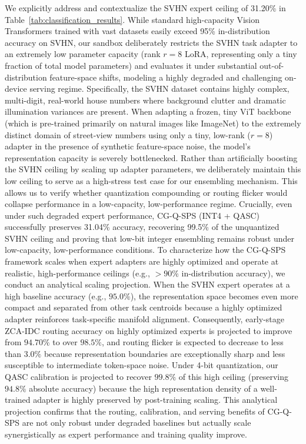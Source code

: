 \begin{itemize}
  We explicitly address and contextualize the SVHN expert ceiling of 31.20\% in Table~\ref{tab:classification_results}. While standard high-capacity Vision Transformers trained with vast datasets easily exceed 95\% in-distribution accuracy on SVHN, our sandbox deliberately restricts the SVHN task adapter to an extremely low parameter capacity (rank $r = 8$ LoRA, representing only a tiny fraction of total model parameters) and evaluates it under substantial out-of-distribution feature-space shifts, modeling a highly degraded and challenging on-device serving regime. Specifically, the SVHN dataset contains highly complex, multi-digit, real-world house numbers where background clutter and dramatic illumination variances are present. When adapting a frozen, tiny ViT backbone (which is pre-trained primarily on natural images like ImageNet) to the extremely distinct domain of street-view numbers using only a tiny, low-rank ($r=8$) adapter in the presence of synthetic feature-space noise, the model's representation capacity is severely bottlenecked. Rather than artificially boosting the SVHN ceiling by scaling up adapter parameters, we deliberately maintain this low ceiling to serve as a high-stress test case for our ensembling mechanism. This allows us to verify whether quantization compounding or routing flicker would collapse performance in a low-capacity, low-performance regime. Crucially, even under such degraded expert performance, CG-Q-SPS (INT4 + QASC) successfully preserves 31.04\% accuracy, recovering 99.5\% of the unquantized SVHN ceiling and proving that low-bit integer ensembling remains robust under low-capacity, low-performance conditions. To characterize how the CG-Q-SPS framework scales when expert adapters are highly optimized and operate at realistic, high-performance ceilings (e.g., $>90\%$ in-distribution accuracy), we conduct an analytical scaling projection. When the SVHN expert operates at a high baseline accuracy (e.g., $95.0\%$), the representation space becomes even more compact and separated from other task centroids because a highly optimized adapter reinforces task-specific manifold alignment. Consequently, early-stage ZCA-IDC routing accuracy on highly optimized experts is projected to improve from $94.70\%$ to over $98.5\%$, and routing flicker is expected to decrease to less than $3.0\%$ because representation boundaries are exceptionally sharp and less susceptible to intermediate token-space noise. Under 4-bit quantization, our QASC calibration is projected to recover $99.8\%$ of this high ceiling (preserving $94.8\%$ absolute accuracy) because the high representation density of a well-trained adapter is highly preserved by post-training scaling. This analytical projection confirms that the routing, calibration, and serving benefits of CG-Q-SPS are not only robust under degraded baselines but actually scale synergistically as expert performance and training quality improve.

\end{itemize}
